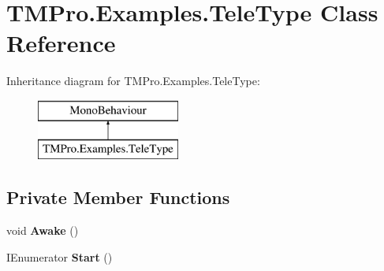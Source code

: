 \hypertarget{class_t_m_pro_1_1_examples_1_1_tele_type}{}\section{T\+M\+Pro.\+Examples.\+Tele\+Type Class Reference}
\label{class_t_m_pro_1_1_examples_1_1_tele_type}
Inheritance diagram for T\+M\+Pro.\+Examples.\+Tele\+Type\+:\begin{figure}[H]
\begin{center}
\leavevmode
\includegraphics[height=2.000000cm]{class_t_m_pro_1_1_examples_1_1_tele_type}
\end{center}
\end{figure}
\subsection*{Private Member Functions}
\begin{DoxyCompactItemize}
\item 
\mbox{\label{class_t_m_pro_1_1_examples_1_1_tele_type_a2941c99e0e5b66827cab3c48df12278a}} 
void {\bfseries Awake} ()
\item 
\mbox{\label{class_t_m_pro_1_1_examples_1_1_tele_type_ab60c17eaa598b380cb7ea3d0346f35fd}} 
I\+Enumerator {\bfseries Start} ()
\end{DoxyCompactItemize}
